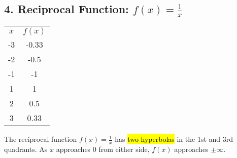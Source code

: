 \documentclass[12pt,a4paper]{article}
\begin{document}
\subsection*{4. Reciprocal Function: $f(x) = \frac{1}{x}$}
\begin{minipage}{0.5\textwidth}
\end{minipage}
\hspace{1cm}
\begin{minipage}{0.4\textwidth}
\centering
\begin{tabular}{cc}

$x$ & $f(x)$ \\

-3 & -0.33 \\
-2 & -0.5 \\
-1 & -1 \\
1 & 1 \\
2 & 0.5 \\
3 & 0.33 \\

\end{tabular}
\end{minipage}
\noindent
The reciprocal function $f(x) = \frac{1}{x}$ has \hl{two hyperbolas} in the 1st and 3rd quadrants. As $x$ approaches 0 from either side, $f(x)$ approaches $\pm\infty$. 
\end{document}
